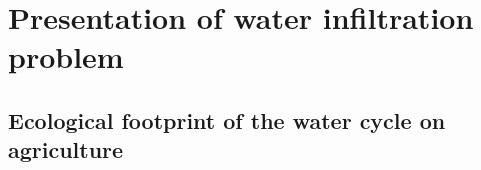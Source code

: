\section{Presentation of water infiltration problem}
\subsection{Ecological footprint of the water cycle on agriculture}

